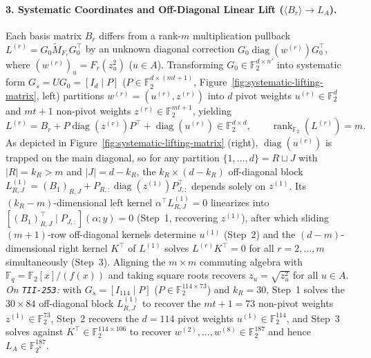 \documentclass[11pt,a4paper]{article}
\theoremstyle{definition}
\theoremstyle{remark}
\newcommand{\F}{\mathbb{F}}
\newcommand{\rk}{\operatorname{rank}}
\newcommand{\diag}{\operatorname{diag}}
\begin{document}
\paragraph{3. Systematic Coordinates and Off-Diagonal Linear Lift ($\langle B_r \rangle \to L_A$).}
Each basis matrix $B_r$ differs from a rank-$m$ multiplication pullback $L^{(r)} = G_0 \widetilde{M}_{F_r} G_0^\top$ by an unknown diagonal correction $G_0 \diag(w^{(r)}) G_0^\top$, where $(w^{(r)})_u = F_r(z_u^2)$ ($u \in A$). Transforming $G_0 \in \F_2^{d \times n'}$ into systematic form $G_s = U G_0 = [I_d \mid P]$ ($P \in \F_2^{d \times (mt+1)}$, Figure~\ref{fig:systematic-lifting-matrix}, left) partitions $w^{(r)} = (u^{(r)}, z^{(r)})$ into $d$ pivot weights $u^{(r)} \in \F_2^d$ and $mt + 1$ non-pivot weights $z^{(r)} \in \F_2^{mt+1}$, yielding
\[
    L^{(r)} = B_r + P\diag(z^{(r)})P^\top + \diag(u^{(r)}) \in \F_2^{d \times d}, \qquad \rk_{\F_2}(L^{(r)}) = m.
\]
As depicted in Figure~\ref{fig:systematic-lifting-matrix} (right), $\diag(u^{(r)})$ is trapped on the main diagonal, so for any partition $\{1, \dots, d\} = R \sqcup J$ with $|R| = k_R > m$ and $|J| = d - k_R$, the $k_R \times (d - k_R)$ off-diagonal block $L^{(1)}_{R, J} = (B_1)_{R, J} + P_{R,:}\diag(z^{(1)})P_{J,:}^\top$ depends solely on $z^{(1)}$. Its $(k_R - m)$-dimensional left kernel $\alpha^\top L^{(1)}_{R, J} = 0$ linearizes into $[(B_1)_{R, J}^\top \mid P_{J,:}](\alpha; y) = 0$ (Step~1, recovering $z^{(1)}$), after which sliding $(m+1)$-row off-diagonal kernels determine $u^{(1)}$ (Step~2) and the $(d - m)$-dimensional right kernel $K^\top$ of $L^{(1)}$ solves $L^{(r)}K^\top = 0$ for all $r = 2, \dots, m$ simultaneously (Step~3). Aligning the $m \times m$ commuting algebra with $\F_q = \F_2[x]/(f(x))$ and taking square roots recovers $z_u = \sqrt{z_u^2}$ for all $u \in A$.
\emph{On \texttt{TII-253}:} with $G_s = [I_{114} \mid P]$ ($P \in \F_2^{114 \times 73}$) and $k_R = 30$, Step~1 solves the $30 \times 84$ off-diagonal block $L^{(1)}_{R, J}$ to recover the $mt + 1 = 73$ non-pivot weights $z^{(1)} \in \F_2^{73}$, Step~2 recovers the $d = 114$ pivot weights $u^{(1)} \in \F_2^{114}$, and Step~3 solves against $K^\top \in \F_2^{114 \times 106}$ to recover $w^{(2)}, \dots, w^{(8)} \in \F_2^{187}$ and hence $L_A \in \F_{2^8}^{187}$.
\end{document}
